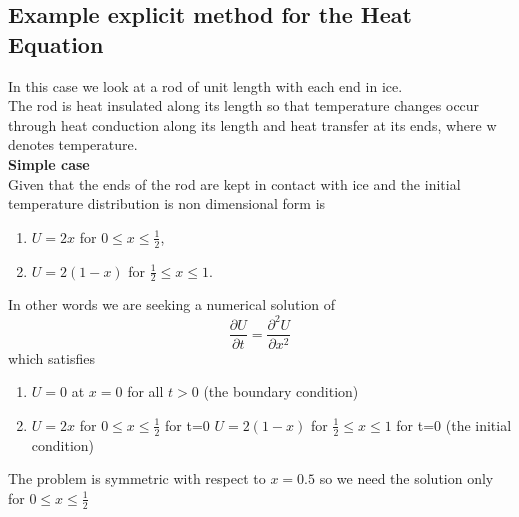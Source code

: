 \subsection{Example explicit method for the Heat Equation} 
In this case we look at a rod of unit length with each end in ice.\\
The rod is heat insulated along its length so that temperature changes occur through
heat conduction along its length and heat transfer at its ends, where w denotes
temperature.\\

\textbf{Simple case}\\
Given that the ends of the rod are kept in contact with ice and the initial temperature
distribution is non dimensional form is
\begin{enumerate}
\item $U=2x$ for $0\leq x \leq \frac{1}{2}$, 
\item $U=2(1-x)$ for $\frac{1}{2}\leq x \leq 1$. 
\end{enumerate}
In other words we are seeking a numerical solution of
\[\frac{\partial U}{\partial t}=\frac{\partial^2U }{\partial x^2}\]
which satisfies
\begin{enumerate}
\item $U=0$ at $x=0$ for all $t>0$ (the boundary condition)
\item $U=2x$ for $0\leq x \leq \frac{1}{2}$ for t=0
$U=2(1-x)$ for $\frac{1}{2}\leq x \leq 1$ for t=0 (the initial condition)
\end{enumerate}
The problem is symmetric with respect to $x=0.5$ so we need the solution only for $0\leq x \leq \frac{1}{2}$
